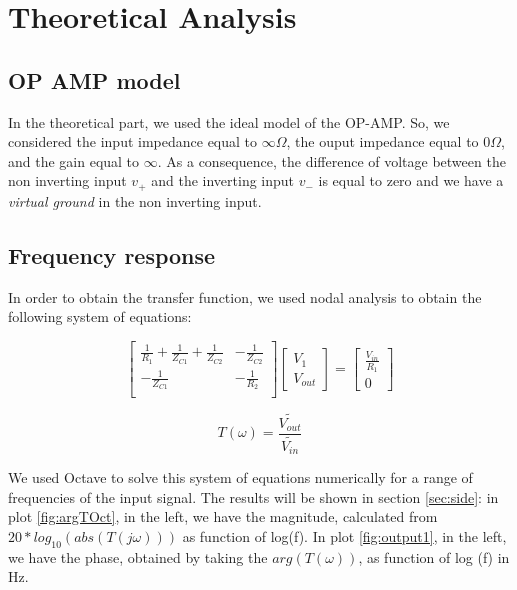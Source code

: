 \section{Theoretical Analysis}
\label{sec:analysis}

\subsection{OP AMP model}

In the theoretical part, we used the ideal model of the OP-AMP. So, we considered the input impedance equal to $\infty \Omega$, the ouput impedance
equal to $0 \Omega$, and the gain equal to $\infty$. As a consequence, the difference of voltage between the non inverting input $v_{+}$ and the
inverting input $v_{-}$ is equal to zero and we have a \textit{virtual ground} in the non inverting input.


\subsection{Frequency response}

In order to obtain the transfer function, we used nodal analysis to obtain the following system of equations:

\[
  \begin{bmatrix}
    \frac{1}{R_1} + \frac{1}{Z_{C1}} + \frac{1}{Z_{C2}} & -\frac{1}{Z_{C2}} \\
    -\frac{1}{Z_{C1}}                                   & -\frac{1}{R_2}    \\
  \end{bmatrix}
  \begin{bmatrix}
    V_{1} \\ V_{out}
  \end{bmatrix}
  =
  \begin{bmatrix}
    \frac{V_{in}}{R_1} \\ 0
  \end{bmatrix}
\]

\hfill


\begin{equation}
  T(\omega) = \frac{\widetilde{V_{out}}}{\widetilde{V_{in}}}
  \label{frequencyR}
\end{equation}

We used Octave to solve this system of equations numerically for a range of frequencies of the input signal. The results will be shown in section \ref{sec:side}:
 in plot \ref{fig:argTOct}, in the left, we have the magnitude, calculated from $20*log_{10}(abs(T(j\omega)))$ as function of log(f). 
 In plot \ref{fig:output1}, in the left, we have the phase, obtained by taking the $arg(T(\omega))$, as function of log (f) in Hz.

